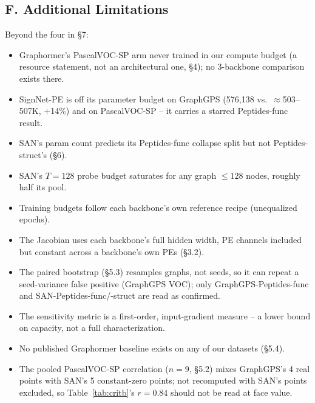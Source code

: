 \documentclass[10pt]{article}
\begin{document}
{\subsection*{F. Additional Limitations}
\label{app:limitations}
Beyond the four in \S7:
\begin{itemize}[leftmargin=1.1em, itemsep=0pt, topsep=0.5pt, parsep=0pt]
\item Graphormer's PascalVOC-SP arm never trained in our compute budget (a resource statement, not an architectural one, \S4); no 3-backbone comparison exists there.
\item SignNet-PE is off its parameter budget on GraphGPS (576,138 vs.\ $\approx$503--507K, +14\%) and on PascalVOC-SP -- it carries a starred Peptides-func result.
\item SAN's param count predicts its Peptides-func collapse split but not Peptides-struct's (\S6).
\item SAN's $T{=}128$ probe budget saturates for any graph $\le128$ nodes, roughly half its pool.
\item Training budgets follow each backbone's own reference recipe (unequalized epochs).
\item The Jacobian uses each backbone's full hidden width, PE channels included but constant across a backbone's own PEs (\S3.2).
\item The paired bootstrap (\S5.3) resamples graphs, not seeds, so it can repeat a seed-variance false positive (GraphGPS VOC); only GraphGPS-Peptides-func and SAN-Peptides-func/-struct are read as confirmed.
\item The sensitivity metric is a first-order, input-gradient measure -- a lower bound on capacity, not a full characterization.
\item No published Graphormer baseline exists on any of our datasets (\S5.4).
\item The pooled PascalVOC-SP correlation ($n{=}9$, \S5.2) mixes GraphGPS's 4 real points with SAN's 5 constant-zero points; not recomputed with SAN's points excluded, so Table~\ref{tab:critb}'s $r{=}0.84$ should not be read at face value.
\end{itemize}
}
\end{document}
